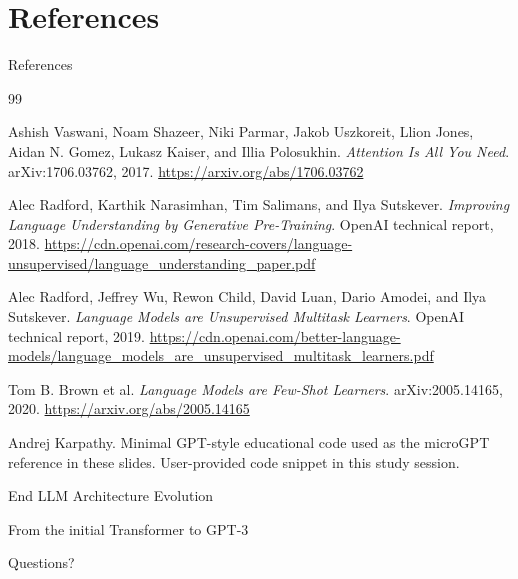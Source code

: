 \documentclass[10pt,aspectratio=169]{beamer}
\begin{document}
\section{References}

\begin{frame}[allowframebreaks]{References}
\tiny
\begin{thebibliography}{99}

Ashish Vaswani, Noam Shazeer, Niki Parmar, Jakob Uszkoreit, Llion Jones, Aidan N. Gomez, Lukasz Kaiser, and Illia Polosukhin.
\newblock \emph{Attention Is All You Need}.
\newblock arXiv:1706.03762, 2017.
\newblock \url{https://arxiv.org/abs/1706.03762}

Alec Radford, Karthik Narasimhan, Tim Salimans, and Ilya Sutskever.
\newblock \emph{Improving Language Understanding by Generative Pre-Training}.
\newblock OpenAI technical report, 2018.
\newblock \url{https://cdn.openai.com/research-covers/language-unsupervised/language_understanding_paper.pdf}

Alec Radford, Jeffrey Wu, Rewon Child, David Luan, Dario Amodei, and Ilya Sutskever.
\newblock \emph{Language Models are Unsupervised Multitask Learners}.
\newblock OpenAI technical report, 2019.
\newblock \url{https://cdn.openai.com/better-language-models/language_models_are_unsupervised_multitask_learners.pdf}

Tom B. Brown et al.
\newblock \emph{Language Models are Few-Shot Learners}.
\newblock arXiv:2005.14165, 2020.
\newblock \url{https://arxiv.org/abs/2005.14165}

Andrej Karpathy.
\newblock Minimal GPT-style educational code used as the microGPT reference in these slides.
\newblock User-provided code snippet in this study session.

\end{thebibliography}
\end{frame}

\begin{frame}{End}
\centering
{\Large LLM Architecture Evolution}\par
\bigskip
{\large From the initial Transformer to GPT-3}\par
\bigskip\bigskip
Questions?
\end{frame}
\end{document}
